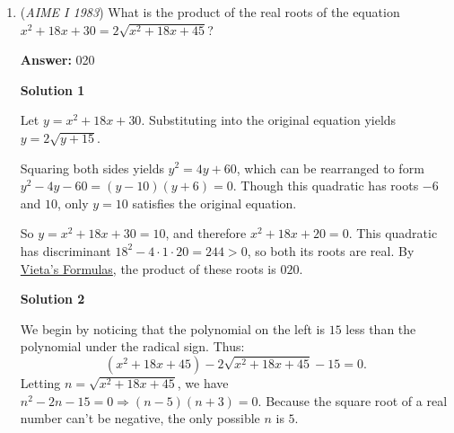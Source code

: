 \begin{enumerate}
 Under the given circumstances, we notice that $|x-p|=x-p$, $|x-15|=15-x$, and $|x-p-15|=15+p-x$.

 Adding these together, we find that the sum is equal to $30-x$, which attains its minimum value (on the given interval $p \leq x \leq 15$) when $x=15$, giving a minimum of $\boxed{015}$.

 



\textbf{Solution 2}

Let $p$ be equal to $15 - \varepsilon$, where $\varepsilon$ is an almost neglectable value. Because of the small value $\varepsilon$, the \href{https://artofproblemsolving.com/wiki/index.php?title=Domain}{domain} of $f(x)$ is basically the \href{https://artofproblemsolving.com/wiki/index.php?title=Set}{set} ${15}$. plugging in $15$ gives $\varepsilon + 0 + 15 - \varepsilon$, or $15$, so the answer is $\boxed{015}$



	\item (\textit{AIME I 1983}) What is the product of the real roots of the equation $x^2 + 18x + 30 = 2 \sqrt{x^2 + 18x + 45}$?


 
 \textbf{Answer: }020



\textbf{Solution 1}

Let $y=x^2+18x+30$. Substituting into the original equation yields $y=2\sqrt{y+15}$.

 Squaring both sides yields $y^2 = 4y + 60$, which can be rearranged to form $y^2 - 4y - 60 = (y-10)(y+6) = 0$.  Though this quadratic has roots $-6$ and $10$, only $y=10$ satisfies the original equation.

 So $y=x^2+18x+30=10$, and therefore $x^2+18x+20=0$.  This quadratic has discriminant $18^2 - 4 \cdot 1 \cdot 20 = 244 > 0$, so both its roots are real. By \href{https://artofproblemsolving.com/wiki/index.php?title=Vieta\%27s\_Formulas}{Vieta's Formulas}, the product of these roots is $\boxed{020}$.

 



\textbf{Solution 2}

We begin by noticing that the polynomial on the left is $15$ less than the polynomial under the radical sign. Thus: 
 \[(x^2+ 18x + 45) - 2\sqrt{x^2+18x+45} - 15 = 0.\] Letting $n = \sqrt{x^2+18x+45}$, we have $n^2-2n-15 = 0 \Longrightarrow (n-5)(n+3) = 0$. Because the square root of a real number can't be negative, the only possible $n$ is $5$.


\end{enumerate}
